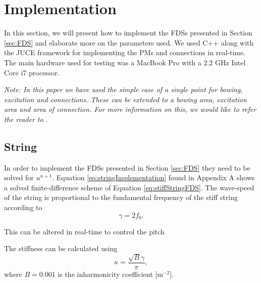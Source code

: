 \documentclass{article}
\begin{document}
\section{Implementation}\label{sec:implementation}
In this section, we will present how to implement the FDSs presented in Section \ref{sec:FDS} and elaborate more on the parameters used. We used C++ along with the JUCE framework for implementing the PMs and connections in real-time. The main hardware used for testing was a MacBook Pro with a 2.2 GHz Intel Core i7 processor.

\textit{Note: In this paper we have used the simple case of a single point for bowing, excitation and connections. These can be extended to a bowing area, excitation area and area of connection. For more information on this, we would like to refer the reader to \cite{Bilbao2009:ModularPercussion}}.

\subsection{String}
In order to implement the FDSs presented in Section \ref{sec:FDS} they need to be solved for $u^{n+1}$. Equation \eqref{eq:stringImplementation} found in Appendix A shows a solved finite-difference scheme of Equation \eqref{eq:stiffStringFDS}.
The wave-speed of the string is proportional to the fundamental frequency of the stiff string according to
\begin{equation}
    \gamma = 2 f_0.
\end{equation}

This can be altered in real-time to control the pitch





The stiffness can be calculated using
\begin{equation}
    \kappa = \frac{\sqrt{B}\gamma}{\pi},
\end{equation}
where $B = 0.001$ is the inharmonicity coefficient [m$^{-2}$].
\end{document}

